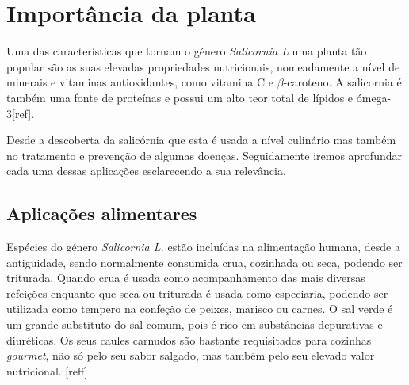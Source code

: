  



\newpage

\section{Importância da planta}


Uma das características que tornam o género \textit{Salicornia L} uma planta tão popular são as suas elevadas propriedades nutricionais, nomeadamente a nível de minerais e vitaminas antioxidantes, como vitamina C e $\beta$-caroteno. A salicornia é também uma fonte de proteínas e possui um alto teor total de lípidos e ómega-3[ref].   %


Desde a descoberta da salicórnia que esta é usada a nível culinário mas também no tratamento e prevenção de algumas doenças. Seguidamente iremos aprofundar cada uma dessas aplicações esclarecendo a sua relevância. 



\subsection{Aplicações alimentares}


Espécies do género \textit{Salicornia L.} estão incluídas na alimentação humana, desde a antiguidade, sendo normalmente consumida crua, cozinhada ou seca, podendo ser triturada. Quando crua é usada como acompanhamento das mais diversas refeições enquanto que seca ou triturada é usada como especiaria, podendo ser utilizada como tempero na confeção de peixes, marisco ou carnes. O sal verde é um grande substituto do sal comum, pois é rico em substâncias depurativas e diuréticas. Os seus caules carnudos são bastante requisitados para cozinhas \textit{gourmet}, não só pelo seu sabor salgado, mas também pelo seu elevado valor nutricional.  [reff]


 





